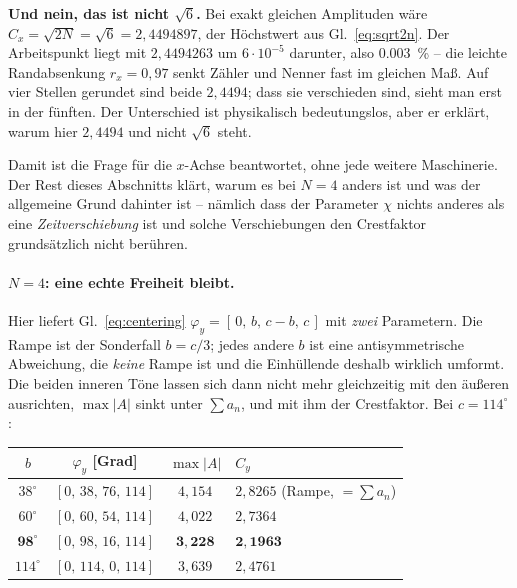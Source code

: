 \documentclass[11pt,a4paper]{article}
\newcommand{\crest}{\ensuremath{C}}
\begin{document}
\medskip
\noindent\textbf{Und nein, das ist nicht \boldmath$\sqrt6$.} Bei exakt
gleichen Amplituden wäre $\crest_x = \sqrt{2N} = \sqrt6 = 2{,}4494897$, der
Höchstwert aus Gl.~\eqref{eq:sqrt2n}. Der Arbeitspunkt liegt mit
$2{,}4494263$ um $6\cdot10^{-5}$ darunter, also \SI{0.003}{\percent} -- die
leichte Randabsenkung $r_x=0{,}97$ senkt Zähler und Nenner fast im gleichen
Maß. Auf vier Stellen gerundet sind beide $2{,}4494$; dass sie verschieden
sind, sieht man erst in der fünften. Der Unterschied ist physikalisch
bedeutungslos, aber er erklärt, warum hier $2{,}4494$ und nicht $\sqrt6$
steht.

\medskip
\noindent{}

\medskip
\noindent Damit ist die Frage für die $x$-Achse beantwortet, ohne jede
weitere Maschinerie. Der Rest dieses Abschnitts klärt, warum es bei $N=4$
anders ist und was der allgemeine Grund dahinter ist -- nämlich dass der
Parameter $\chi$ nichts anderes als eine \emph{Zeitverschiebung} ist und
solche Verschiebungen den Crestfaktor grundsätzlich nicht berühren.

\paragraph{\boldmath$N=4$: eine echte Freiheit bleibt.}

Hier liefert Gl.~\eqref{eq:centering} $\varphi_y=[\,0,\,b,\,c-b,\,c\,]$ mit
\emph{zwei} Parametern. Die Rampe ist der Sonderfall $b=c/3$; jedes andere
$b$ ist eine antisymmetrische Abweichung, die \emph{keine} Rampe ist und die
Einhüllende deshalb wirklich umformt. Die beiden inneren Töne lassen sich
dann nicht mehr gleichzeitig mit den äußeren ausrichten, $\max|A|$ sinkt unter
$\sum a_n$, und mit ihm der Crestfaktor. Bei $c=114^\circ$:

\begin{center}
\begin{tabular}{cccl}
  \toprule
  $b$ & $\varphi_y$ [Grad] & $\max|A|$ & $\crest_y$\\
  \midrule
  $38^\circ$ & $[0,\,38,\,76,\,114]$ & $4{,}154$ & $2{,}8265$ \quad(Rampe, $=\sum a_n$)\\
  $60^\circ$ & $[0,\,60,\,54,\,114]$ & $4{,}022$ & $2{,}7364$\\
  $\mathbf{98^\circ}$ & $[0,\,98,\,16,\,114]$ & $\mathbf{3{,}228}$ & $\mathbf{2{,}1963}$\\
  $114^\circ$ & $[0,\,114,\,0,\,114]$ & $3{,}639$ & $2{,}4761$\\
  \bottomrule
\end{tabular}
\end{center}
\end{document}
